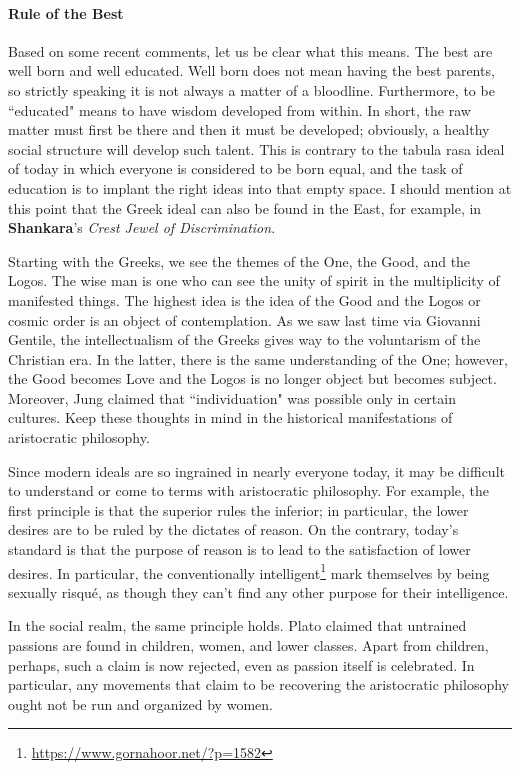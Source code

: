 \paragraph{Rule of the Best}
Based on some recent comments, let us be clear what this means. The best are well born and well educated. Well born does not mean having the best parents, so strictly speaking it is not always a matter of a bloodline. Furthermore, to be ``educated" means to have wisdom developed from within. In short, the raw matter must first be there and then it must be developed; obviously, a healthy social structure will develop such talent. This is contrary to the tabula rasa ideal of today in which everyone is considered to be born equal, and the task of education is to implant the right ideas into that empty space. I should mention at this point that the Greek ideal can also be found in the East, for example, in \textbf{Shankara}'s \emph{Crest Jewel of Discrimination}.

Starting with the Greeks, we see the themes of the One, the Good, and the Logos. The wise man is one who can see the unity of spirit in the multiplicity of manifested things. The highest idea is the idea of the Good and the Logos or cosmic order is an object of contemplation. As we saw last time via Giovanni Gentile, the intellectualism of the Greeks gives way to the voluntarism of the Christian era. In the latter, there is the same understanding of the One; however, the Good becomes Love and the Logos is no longer object but becomes subject. Moreover, Jung claimed that ``individuation" was possible only in certain cultures. Keep these thoughts in mind in the historical manifestations of aristocratic philosophy.

Since modern ideals are so ingrained in nearly everyone today, it may be difficult to understand or come to terms with aristocratic philosophy. For example, the first principle is that the superior rules the inferior; in particular, the lower desires are to be ruled by the dictates of reason. On the contrary, today's standard is that the purpose of reason is to lead to the satisfaction of lower desires. In particular, the conventionally intelligent\footnote{\url{https://www.gornahoor.net/?p=1582}} mark themselves by being sexually risqué, as though they can't find any other purpose for their intelligence.

In the social realm, the same principle holds. Plato claimed that untrained passions are found in children, women, and lower classes. Apart from children, perhaps, such a claim is now rejected, even as passion itself is celebrated. In particular, any movements that claim to be recovering the aristocratic philosophy ought not be run and organized by women.

